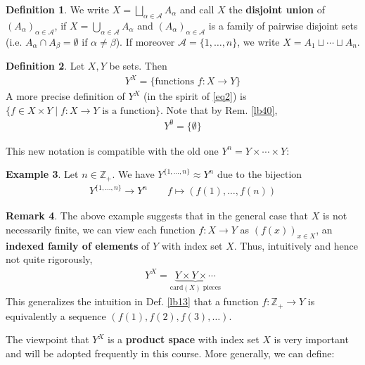 \documentclass[12pt,b5paper,notitlepage]{article}
\theoremstyle{definition}
\newtheorem{df}{Definition}[section]
\newtheorem{eg}[df]{Example}
\newtheorem{rem}[df]{Remark}
\theoremstyle{plain}
\newcommand{\scr}{\mathscr}
\newcommand{\Zbb}{\mathbb Z}
\newcommand{\card}{\mathrm{card}}
\numberwithin{equation}{section}
\begin{document}
\begin{df}
We write $X=\bigsqcup_{\alpha\in\scr A}A_\alpha$ \index{A@$\bigsqcup_{\alpha\in\scr A}A_\alpha$, the disjoint union} and call $X$ the \textbf{disjoint union}  of $(A_\alpha)_{\alpha\in\scr A}$,  if $X=\bigcup_{\alpha\in\scr A}A_\alpha$ and $(A_\alpha)_{\alpha\in\scr A}$ is a family of pairwise disjoint sets (i.e. $A_\alpha\cap A_\beta=\emptyset$ if $\alpha\neq\beta$). If moreover $\scr A=\{1,\dots,n\}$, we write $X=A_1\sqcup\cdots\sqcup A_n$.
\end{df}

\begin{df}
Let $X,Y$ be sets. Then 
\begin{align}
Y^X=\{\text{functions }f:X\rightarrow Y\}
\end{align}
A more precise definition of $Y^X$ (in the spirit of \eqref{eq2}) is $\{f\in X\times Y \mid f:X\rightarrow Y\text{ is a function}\}$. Note that by Rem. \ref{lb40},
\begin{align}
Y^\emptyset=\{\emptyset\}  \label{eq10}
\end{align}
\end{df}

This new notation is compatible with the old one $Y^n=Y\times\cdots\times Y$:
\begin{eg}
Let $n\in\Zbb_+$. We have $Y^{\{1,\dots,n\}}\approx Y^n$ due to the bijection
\begin{align*}
Y^{\{1,\dots,n\}}\rightarrow Y^n\qquad f\mapsto (f(1),\dots,f(n))
\end{align*}
\end{eg}

\begin{rem}\label{lb18}
The above example suggests that in the general case that $X$ is not necessarily finite, we can view each function $f:X\rightarrow Y$ as $(f(x))_{x\in X}$, an \textbf{indexed family of elements} of $Y$ with index set $X$. Thus, intuitively and hence not quite rigorously, 
\begin{align}
Y^X=\underbrace{Y\times Y\times\cdots}_{\card(X)\text{ pieces}} \label{eq11}
\end{align}
This generalizes the intuition in Def. \ref{lb13} that a function $f:\Zbb_+\rightarrow Y$ is equivalently a sequence $(f(1),f(2),f(3),\dots)$.

The viewpoint that $Y^X$ is a \textbf{product space} with index set $X$ is very important and will be adopted frequently in this course. More generally, we can define:\hfill\qedsymbol
\end{rem}
\end{document}
